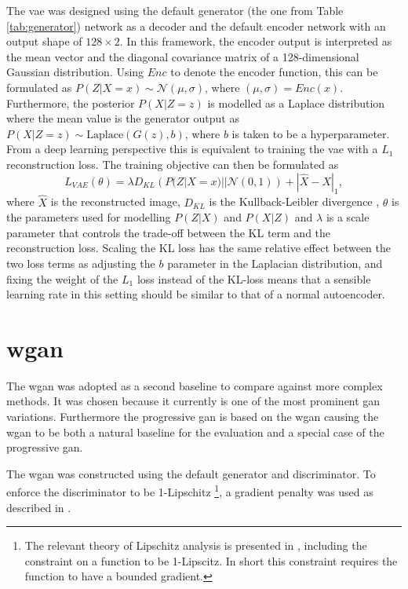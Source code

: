 The \acrlong{vae} was designed using the default generator (the one from Table \ref{tab:generator}) network as a decoder and the default encoder network with an output shape of $128\times2$. In this framework, the encoder output is interpreted as the mean vector and the diagonal covariance matrix of a 128-dimensional Gaussian distribution. Using $Enc$ to denote the encoder function, this can be formulated as $P(Z|X=x) \sim \mathcal{N}(\mu, \sigma)$, where $(\mu, \sigma) = Enc(x)$. Furthermore, the posterior $P(X|Z=z)$ is modelled as a Laplace distribution where the mean value is the generator output as $P(X|Z=z) \sim \text{Laplace}(G(z), b)$, where $b$ is taken to be a hyperparameter. From a deep learning perspective this is equivalent to training the \acrshort{vae} with a $L_1$ reconstruction loss. The training objective can then be formulated as 
\begin{equation}
    L_{VAE}(\theta) = \lambda D_{KL}\left(P(Z|X=x) || \mathcal{N}(0,1)\right) + |\hat{X} - X|_1,
\end{equation}
where $\hat{X}$ is the reconstructed image, $D_{KL}$ is the Kullback-Leibler divergence \parencite{kullback1951information}, $\theta$ is the parameters used for modelling $P(Z|X)$ and $P(X|Z)$ and $\lambda$ is a scale parameter that controls the trade-off between the KL term and the reconstruction loss. Scaling the KL loss has the same relative effect between the two loss terms as adjusting the $b$ parameter in the Laplacian distribution, and fixing the weight of the $L_1$ loss instead of the KL-loss means that a sensible learning rate in this setting should be similar to that of a normal autoencoder. 

\section{\acrlong{wgan}}
The \acrfull{wgan} was adopted as a second baseline to compare against more complex methods. It was chosen because it currently is one of the most prominent \acrshort{gan} variations. Furthermore the progressive \acrshort{gan} is based on the \acrshort{wgan} causing the \acrshort{wgan} to be both a natural baseline for the evaluation and a special case of the progressive \acrshort{gan}. 

The \acrshort{wgan} was constructed using the default generator and discriminator. To enforce the discriminator to be 1-Lipschitz \footnote{The relevant theory of Lipschitz analysis is presented in \parencite{heinonen2005lectures}, including the constraint on a function to be 1-Lipscitz. In short this constraint requires the function to have a bounded gradient.}, a gradient penalty was used as described in \parencite{gulrajani2017improved}.

